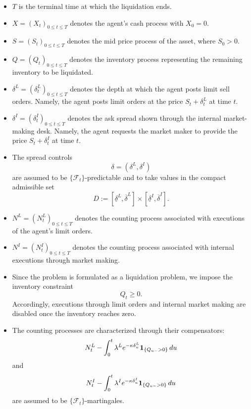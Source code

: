 \documentclass[12pt]{article}
\begin{document}
\begin{itemize}

\item
$T$ is the terminal time at which the liquidation ends.

\item
$X=(X_t)_{0\le t\le T}$ denotes the agent's cash process with
$X_0=0$.

\item
$S=(S_t)_{0\le t\le T}$ denotes the mid price process of the asset,
where $S_0>0$.

\item
$Q=(Q_t)_{0\le t\le T}$ denotes the inventory process representing
the remaining inventory to be liquidated.

\item
$\delta^L=(\delta^L_t)_{0\le t\le T}$ denotes the depth at which
the agent posts limit sell orders.
Namely, the agent posts limit orders at the price
$S_t+\delta^L_t$ at time $t$.

\item
$\delta^I=(\delta^I_t)_{0\le t\le T}$ denotes the ask spread shown
through the internal market-making desk.
Namely, the agent requests the market maker to provide the price
$S_t+\delta^I_t$ at time $t$.

\item
The spread controls
\[
\delta=(\delta^L,\delta^I)
\]
are assumed to be $\{\mathcal F_t\}$-predictable and to take values
in the compact admissible set
\[
D
:=
[\underline\delta^L,\overline\delta^L]
\times
[\underline\delta^I,\overline\delta^I].
\]

\item
$N^L=(N^L_t)_{0\le t\le T}$ denotes the counting process associated
with executions of the agent's limit orders.

\item
$N^I=(N^I_t)_{0\le t\le T}$ denotes the counting process associated
with internal executions through market making.

\item
Since the problem is formulated as a liquidation problem,
we impose the inventory constraint
\[
Q_t\ge0.
\]
Accordingly, executions through limit orders and internal market making
are disabled once the inventory reaches zero.

\item
The counting processes are characterized through their compensators:
\[
N^L_t
-
\int_0^t
\lambda^L e^{-\kappa\delta^L_u}
{\bf 1}_{\{Q_{u-}>0\}}
\,du
\]
and
\[
N^I_t
-
\int_0^t
\lambda^I e^{-\kappa\delta^I_u}
{\bf 1}_{\{Q_{u-}>0\}}
\,du
\]
are assumed to be $\{\mathcal F_t\}$-martingales.


\end{itemize}
\end{document}
